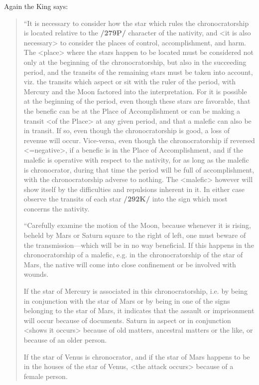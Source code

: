 Again the King says:
\begin{quote}
“It is necessary to consider how the star which rules the chronocratorship is located relative to the \textbf{/279P/} character of the nativity, and <it is also necessary> to consider the places of control, accomplishment, and harm. The <place> where the stars happen to be located must be considered not only at the beginning of the chronocratorship, but also in the succeeding period, and the transits of the remaining stars must be taken into account, viz. the transits which aspect or sit with the ruler of the period, with Mercury and the Moon factored into the interpretation. For it is possible at the
beginning of the period, even though these stars are favorable, that the benefic can be at the Place of Accomplishment or can be making a transit <of the Place> at any given period, and that a malefic
can also be in transit. If so, even though the chronocratorship is good, a loss of revenue will occur. Vice-versa, even though the chronocratorship if reversed <=negative>, if a benefic is in the Place of Accomplishment, and if the malefic is operative with respect to the nativity, for as long as the malefic is chronocrator, during that time the period will be full of accomplishment, with the chronocratorship adverse to nothing. The <malefic> however will show itself by the difficulties and repulsions inherent in it. In either case observe the transits of each star \textbf{/292K/} into the sign which most concerns the nativity.

“Carefully examine the motion of the Moon, because whenever it is rising, beheld by Mars or Saturn square to the right of left, one must beware of the transmission—which will be in no way beneficial. If this happens in the chronocratorship of a malefic, e.g. in the chronocratorship of the star of Mars, the native will come into close confinement or be involved with wounds. 

If the star of Mercury is associated in this chronocratorship, i.e. by being in conjunction with the star of Mars or by being in one of the signs belonging to the star of Mars, it indicates that the assault or imprisonment will occur because of documents. Saturn in aspect or in conjunction <shows it occurs> because of old matters, ancestral matters or the like, or because of an older person. 

If the star of Venus is chronocrator, and if the star of Mars happens to be in the houses of the star of Venus, <the attack occurs> because of a female person. 


\end{quote}

